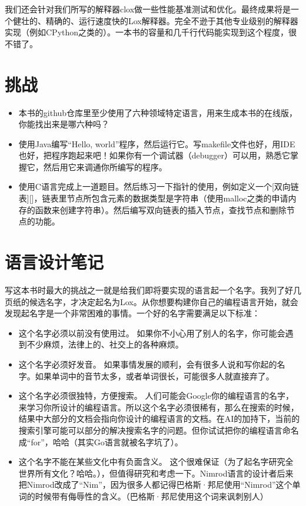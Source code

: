 \documentclass[cn,10pt,math=newtx,citestyle=gb7714-2015,bibstyle=gb7714-2015]{elegantbook}
\begin{document}
我们还会针对我们所写的解释器clox做一些性能基准测试和优化。最终成果将是一个健壮的、精确的、运行速度快的Lox解释器。完全不逊于其他专业级别的解释器实现（例如CPython之类的）。一本书的容量和几千行代码能实现到这个程度，很不错了。

\section{挑战}

\begin{itemize}
   \item 本书的github仓库里至少使用了六种领域特定语言，用来生成本书的在线版，你能找出来是哪六种吗？
   \item 使用Java编写“Hello, world”程序，然后运行它。写makefile文件也好，用IDE也好，把程序跑起来吧！如果你有一个调试器（debugger）可以用，熟悉它掌握它，然后用它来调通你所编写的程序。
   \item 使用C语言完成上一道题目。然后练习一下指针的使用，例如定义一个[双向链表][]，链表里节点所包含元素的数据类型是字符串（使用malloc之类的申请内存的函数来创建字符串）。然后编写双向链表的插入节点，查找节点和删除节点的功能。
\end{itemize}

\section{语言设计笔记}

写这本书时最大的挑战之一就是给我们即将要实现的语言起一个名字。我列了好几页纸的候选名字，才决定起名为Lox。从你想要构建你自己的编程语言开始，就会发现起名字是一个非常困难的事情。一个好的名字需要满足以下标准：

\begin{itemize}
   \item 这个名字必须以前没有使用过。 如果你不小心用了别人的名字，你可能会遇到不少麻烦，法律上的、社交上的各种麻烦。
   \item 这个名字必须好发音。 如果事情发展的顺利，会有很多人说和写你起的名字。如果单词中的音节太多，或者单词很长，可能很多人就直接弃了。
   \item 这个名字必须很独特，方便搜索。 人们可能会Google你的编程语言的名字，来学习你所设计的编程语言。所以这个名字必须很稀有，那么在搜索的时候，结果中大部分的文档会指向你设计的编程语言的文档。在AI的加持下，当前的搜索引擎可能可以部分的解决搜索名字的问题。但你试试把你的编程语言命名成“for”，哈哈（其实Go语言就被名字坑了）。
   \item 这个名字不能在某些文化中有负面含义。 这个很难保证（为了起名字研究全世界所有文化？哈哈。），但值得研究和考虑一下。Nimrod语言的设计者后来把Nimrod改成了“Nim”，因为很多人都记得巴格斯·邦尼使用“Nimrod”这个单词的时候带有侮辱性的含义。（巴格斯·邦尼使用这个词来讽刺别人）
\end{itemize}
\end{document}
